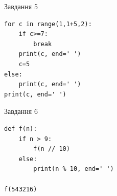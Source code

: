 \documentclass[12pt, ukrainian]{article}
\begin{document}
{\vspace{15mm}
\begin{minipage}[t]{9.7cm}                
{\begin{center}Завдання {5}\end{center}}
\begin{verbatim}
for c in range(1,1+5,2):
    if c>=7:
        break
    print(c, end=' ')
    c=5
else:
    print(c, end=' ')
print(c, end=' ')
\end{verbatim}     
\end{minipage}
\vline \hspace{8mm}
\begin{minipage}[t]{8.0cm}                
{\begin{center}Завдання {6}\end{center}}
\begin{verbatim}
def f(n):
    if n > 9:
        f(n // 10)
    else:
        print(n % 10, end=' ')

f(543216)
\end{verbatim}     
\end{minipage}

}
\newpage
\end{document}
